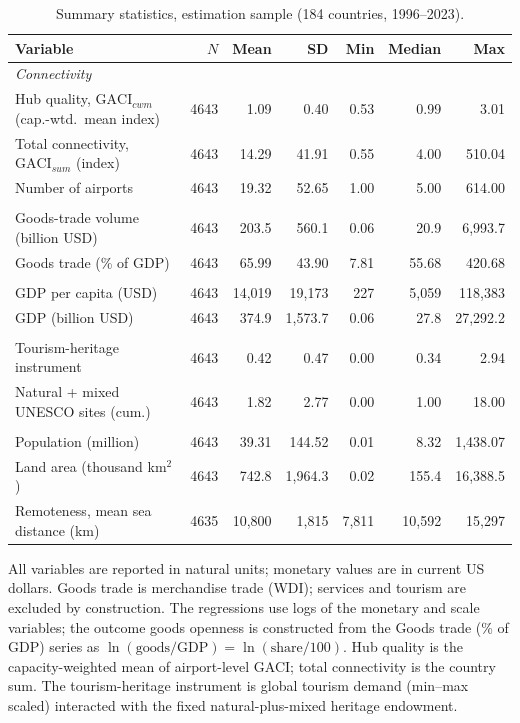 \begin{table}[H]
\centering
\caption{Summary statistics, estimation sample (184 countries, 1996--2023).}
\label{tab:sumstat}
\begin{threeparttable}
\small
\begin{tabular}{lrrrrrr}
\toprule
Variable & $N$ & Mean & SD & Min & Median & Max \\
\midrule
\multicolumn{7}{l}{\emph{Connectivity}}\\
Hub quality, $\mathrm{GACI}_{cwm}$ (cap.-wtd.\ mean index) & 4643 & 1.09 & 0.40 & 0.53 & 0.99 & 3.01 \\
Total connectivity, $\mathrm{GACI}_{sum}$ (index) & 4643 & 14.29 & 41.91 & 0.55 & 4.00 & 510.04 \\
Number of airports & 4643 & 19.32 & 52.65 & 1.00 & 5.00 & 614.00 \\
\addlinespace
\multicolumn{7}{l}{\emph{Trade outcomes}}\\
Goods-trade volume (billion USD) & 4643 & 203.5 & 560.1 & 0.06 & 20.9 & 6{,}993.7 \\
Goods trade (\% of GDP) & 4643 & 65.99 & 43.90 & 7.81 & 55.68 & 420.68 \\
\addlinespace
\multicolumn{7}{l}{\emph{Income}}\\
GDP per capita (USD) & 4643 & 14{,}019 & 19{,}173 & 227 & 5{,}059 & 118{,}383 \\
GDP (billion USD) & 4643 & 374.9 & 1{,}573.7 & 0.06 & 27.8 & 27{,}292.2 \\
\addlinespace
\multicolumn{7}{l}{\emph{Instrument and heritage}}\\
Tourism-heritage instrument & 4643 & 0.42 & 0.47 & 0.00 & 0.34 & 2.94 \\
Natural + mixed UNESCO sites (cum.) & 4643 & 1.82 & 2.77 & 0.00 & 1.00 & 18.00 \\
\addlinespace
\multicolumn{7}{l}{\emph{Controls}}\\
Population (million) & 4643 & 39.31 & 144.52 & 0.01 & 8.32 & 1{,}438.07 \\
Land area (thousand km$^2$) & 4643 & 742.8 & 1{,}964.3 & 0.02 & 155.4 & 16{,}388.5 \\
Remoteness, mean sea distance (km) & 4635 & 10{,}800 & 1{,}815 & 7{,}811 & 10{,}592 & 15{,}297 \\
\bottomrule
\end{tabular}
\begin{tablenotes}\footnotesize
\item All variables are reported in natural units; monetary values are in
current US dollars. Goods trade is merchandise trade (WDI); services and
tourism are excluded by construction. The regressions use logs of the
monetary and scale variables; the outcome goods openness is constructed from
the Goods trade (\% of GDP) series as
$\ln(\text{goods}/\text{GDP})=\ln(\text{share}/100)$. Hub quality is the
capacity-weighted mean of airport-level
GACI; total connectivity is the country sum. The tourism-heritage instrument is
global tourism demand (min--max scaled) interacted with the fixed
natural-plus-mixed heritage endowment.
\end{tablenotes}
\end{threeparttable}
\end{table}


